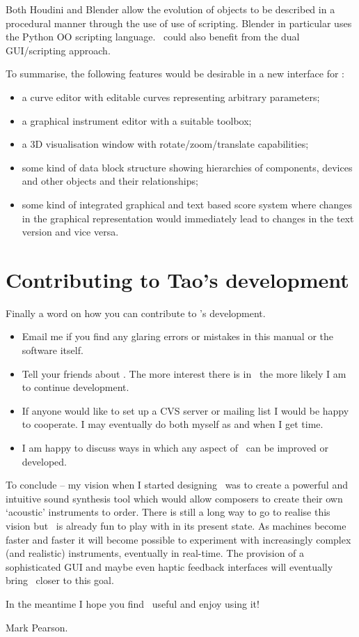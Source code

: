 Both Houdini and Blender allow the evolution of objects to be described
in a procedural manner through the use of use of scripting. Blender in
particular uses the Python OO scripting language. \tao\ could also benefit
from the dual GUI/scripting approach. 

To summarise, the following features would be desirable in a new
interface for \tao:

\begin{itemize}
\item
a curve editor with editable curves representing arbitrary parameters;
\item
a graphical instrument editor with a suitable toolbox;
\item
a 3D visualisation window with rotate/zoom/translate capabilities;
\item
some kind of data block structure showing hierarchies of components,
devices and other objects and their relationships;
\item
some kind of integrated graphical and text based score system
where changes in the graphical representation would immediately
lead to changes in the text version and vice versa.
\end{itemize}

\section{Contributing to Tao's development}
Finally a word on how you can contribute to \tao's development.

\begin{itemize}
\item
Email me if you find any glaring errors or mistakes in this manual or
the software itself.
\item
Tell your friends about \tao. The more interest there is in \tao\ the
more likely I am to continue development.
\item
If anyone would like to set up a CVS server or mailing list I would be
happy to cooperate. I may eventually do both myself as and when I get time.
\item
I am happy to discuss ways in which any aspect of \tao\ can be improved
or developed. 
\end{itemize}

To conclude -- my vision when I started designing \tao\ was to create a
powerful and intuitive sound synthesis tool which would allow composers
to create their own `acoustic' instruments to order. There is still a
long way to go to realise this vision but \tao\ is already fun to play with
in its present state. As machines become faster and faster it will become
possible to experiment with increasingly complex (and realistic) instruments,
eventually in real-time. The provision of a sophisticated GUI and maybe even
haptic feedback interfaces will eventually bring \tao\ closer to this goal. 

In the meantime I hope you find \tao\ useful and enjoy using it!

Mark Pearson.







